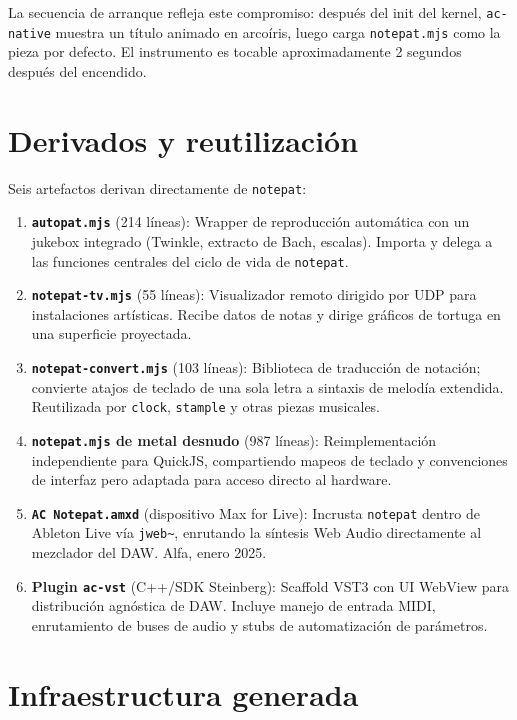 \documentclass[10pt,letterpaper,twocolumn]{article}
\begin{document}
La secuencia de arranque refleja este compromiso: después del init del kernel, \texttt{ac-native} muestra un título animado en arcoíris, luego carga \texttt{notepat.mjs} como la pieza por defecto. El instrumento es tocable aproximadamente 2 segundos después del encendido.

\section{Derivados y reutilización}

Seis artefactos derivan directamente de \texttt{notepat}:

\begin{enumerate}
  \item \textbf{\texttt{autopat.mjs}} (214 líneas): Wrapper de reproducción automática con un jukebox integrado (Twinkle, extracto de Bach, escalas). Importa y delega a las funciones centrales del ciclo de vida de \texttt{notepat}.
  \item \textbf{\texttt{notepat-tv.mjs}} (55 líneas): Visualizador remoto dirigido por UDP para instalaciones artísticas. Recibe datos de notas y dirige gráficos de tortuga en una superficie proyectada.
  \item \textbf{\texttt{notepat-convert.mjs}} (103 líneas): Biblioteca de traducción de notación; convierte atajos de teclado de una sola letra a sintaxis de melodía extendida. Reutilizada por \texttt{clock}, \texttt{stample} y otras piezas musicales.
  \item \textbf{\texttt{notepat.mjs} de metal desnudo} (987 líneas): Reimplementación independiente para QuickJS, compartiendo mapeos de teclado y convenciones de interfaz pero adaptada para acceso directo al hardware.
  \item \textbf{\texttt{AC Notepat.amxd}} (dispositivo Max for Live): Incrusta \texttt{notepat} dentro de Ableton Live vía \texttt{jweb\textasciitilde}, enrutando la síntesis Web Audio directamente al mezclador del DAW. Alfa, enero 2025.
  \item \textbf{Plugin \texttt{ac-vst}} (C++/SDK Steinberg): Scaffold VST3 con UI WebView para distribución agnóstica de DAW. Incluye manejo de entrada MIDI, enrutamiento de buses de audio y stubs de automatización de parámetros.
\end{enumerate}

\section{Infraestructura generada}
\end{document}
